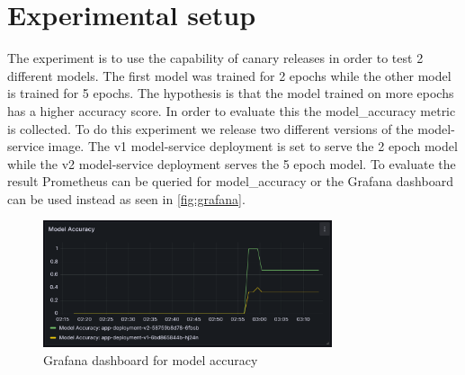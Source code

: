 \section{Experimental setup}
The experiment is to use the capability of canary releases in order to test 2 different models. The first model was trained for 2 epochs while the other model is trained for 5 epochs. The hypothesis is that the model trained on more epochs has a higher accuracy score. In order to evaluate this the model\_accuracy metric is collected. To do this experiment we release two different versions of the model-service image. The v1 model-service deployment is set to serve the 2 epoch model while the v2 model-service deployment serves the 5 epoch model. To evaluate the result Prometheus can be queried for model\_accuracy or the Grafana dashboard can be used instead as seen in \autoref{fig:grafana}.

\begin{figure}[ht!]
    \centering
    \includegraphics[width=8.5cm]{report/images/grafana.png}
    \caption{Grafana dashboard for model accuracy}
    \label{fig:grafana}
\end{figure}